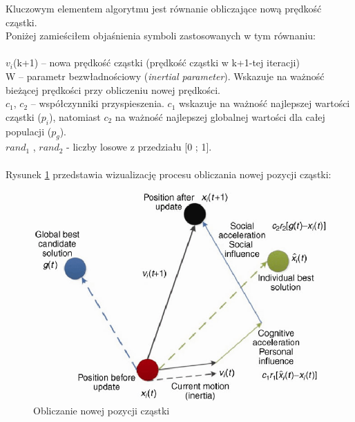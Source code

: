 Kluczowym elementem algorytmu jest równanie obliczające nową prędkość cząstki. \\ Poniżej zamieściłem objaśnienia symboli zastosowanych w tym równaniu: \\ \\
$v_i$(k+1) -- nowa prędkość cząstki (prędkość cząstki w k+1-tej iteracji) \\
W -- parametr bezwładnościowy (\textit{inertial parameter}). Wskazuje na ważność bieżącej prędkości przy obliczeniu nowej prędkości. \\
$c_1$, $c_2$ -- współczynniki przyspieszenia. $c_1$ wskazuje na ważność najlepszej wartości cząstki ($p_i$), natomiast $c_2$ na ważność najlepszej globalnej wartości dla całej populacji ($p_g$). \\
$rand_1$ , $rand_2$  - liczby losowe z przedziału [0 ; 1]. \\ \\
Rysunek \ref{ParticleNewPosition} przedstawia wizualizację procesu obliczania nowej pozycji cząstki:
\vspace{0.5cm}
\begin{figure}[H]
\centering
\includegraphics[width=15cm]{resources/figures/particle_new_pos.png}
\caption{Obliczanie nowej pozycji cząstki}
\label{ParticleNewPosition}
\end{figure}